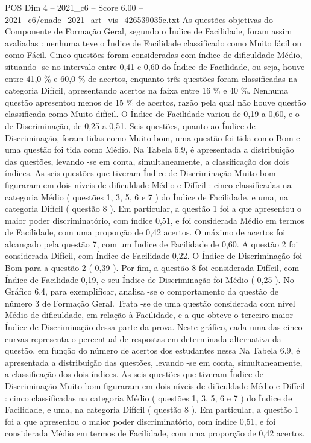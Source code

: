 \begin{textsample}{POS Dim 4 – 2021\_c6 – Score 6.00 – 2021\_c6/enade\_2021\_art\_vis\_426539035c.txt}
As questões objetivas do Componente de Formação Geral, segundo o Índice de Facilidade, foram assim avaliadas : nenhuma teve o Índice de Facilidade classificado como Muito fácil ou como Fácil.
Cinco questões foram consideradas com índice de dificuldade Médio, situando -se no intervalo entre 0,41 e 0,60 do Índice de Facilidade, ou seja, houve entre 41,0 \% e 60,0 \% de acertos, enquanto três questões foram classificadas na categoria Difícil, apresentando acertos na faixa entre 16 \% e 40 \%.
Nenhuma questão apresentou menos de 15 \% de acertos, razão pela qual não houve questão classificada como Muito difícil.
O Índice de Facilidade variou de 0,19 a 0,60, e o de Discriminação, de 0,25 a 0,51.
Seis questões, quanto ao Índice de Discriminação, foram tidas como Muito bom, uma questão foi tida como Bom e uma questão foi tida como Médio.
Na Tabela 6.9, é apresentada a distribuição das questões, levando -se em conta, simultaneamente, a classificação dos dois índices.
As seis questões que tiveram Índice de Discriminação Muito bom figuraram em dois níveis de dificuldade Médio e Difícil : cinco classificadas na categoria Médio ( questões 1, 3, 5, 6 e 7 ) do Índice de Facilidade, e uma, na categoria Difícil ( questão 8 ).
Em particular, a questão 1 foi a que apresentou o maior poder discriminatório, com índice 0,51, e foi considerada Médio em termos de Facilidade, com uma proporção de 0,42 acertos.
O máximo de acertos foi alcançado pela questão 7, com um Índice de Facilidade de 0,60.
A questão 2 foi considerada Difícil, com Índice de Facilidade 0,22.
O Índice de Discriminação foi Bom para a questão 2 ( 0,39 ).
Por fim, a questão 8 foi considerada Difícil, com Índice de Facilidade 0,19, e seu Índice de Discriminação foi Médio ( 0,25 ).
No Gráfico 6.4, para exemplificar, analisa -se o comportamento da questão de número 3 de Formação Geral.
Trata -se de uma questão considerada com nível Médio de dificuldade, em relação à Facilidade, e a que obteve o terceiro maior Índice de Discriminação dessa parte da prova.
Neste gráfico, cada uma das cinco curvas representa o percentual de respostas em determinada alternativa da questão, em função do número de acertos dos estudantes nessa Na Tabela 6.9, é apresentada a distribuição das questões, levando -se em conta, simultaneamente, a classificação dos dois índices.
As seis questões que tiveram Índice de Discriminação Muito bom figuraram em dois níveis de dificuldade Médio e Difícil : cinco classificadas na categoria Médio ( questões 1, 3, 5, 6 e 7 ) do Índice de Facilidade, e uma, na categoria Difícil ( questão 8 ).
Em particular, a questão 1 foi a que apresentou o maior poder discriminatório, com índice 0,51, e foi considerada Médio em termos de Facilidade, com uma proporção de 0,42 acertos.

\end{textsample}
